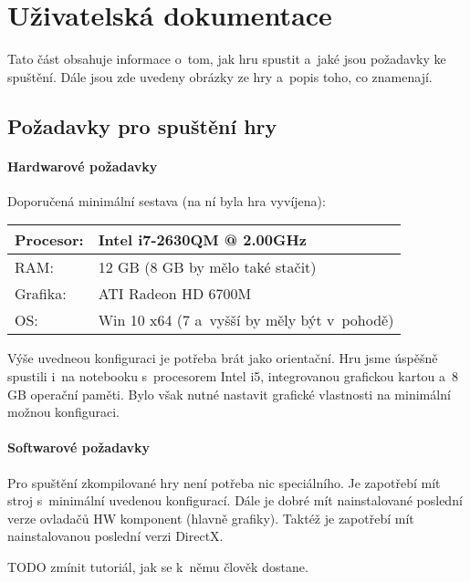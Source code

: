 
\chapter{Uživatelská dokumentace}

Tato část obsahuje informace o~tom, jak hru spustit a~jaké jsou požadavky ke spuštění. Dále jsou zde uvedeny obrázky ze hry a~popis toho, co znamenají. 

\section{Požadavky pro spuštění hry}
\subsubsection{Hardwarové požadavky}

Doporučená minimální sestava (na ní byla hra vyvíjena): 

\begin{center}
	\begin{tabular} { | l | l |}
		\hline
		Procesor: 	&	Intel i7-2630QM @ 2.00GHz \\	\hline
		RAM:		&	12 GB	(8 GB by mělo také stačit) \\	\hline
		Grafika:	&	ATI Radeon HD 6700M \\	\hline
		OS:			&	Win 10 x64	(7 a~vyšší by měly být v~pohodě) \\
		\hline
	\end{tabular}
\end{center}

Výše uvedneou konfiguraci je potřeba brát jako orientační. Hru jsme úspěšně spustili i~na notebooku s~procesorem Intel i5, integrovanou grafickou kartou a~8 GB operační paměti. Bylo však nutné nastavit grafické vlastnosti na minimální možnou konfiguraci. 

\subsubsection{Softwarové požadavky}

Pro spuštění zkompilované hry není potřeba nic speciálního. Je zapotřebí mít stroj s~minimální uvedenou konfigurací. Dále je dobré mít nainstalované poslední verze ovladačů HW komponent (hlavně grafiky).
Taktéž je zapotřebí mít nainstalovanou poslední verzi DirectX. 



TODO zmínit tutoriál, jak se k~němu člověk dostane.












